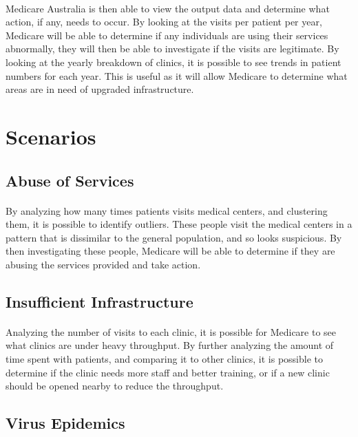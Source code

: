 \documentclass[a4paper,12pt,openany]{report}
\begin{document}
\paragraph{}
	Medicare Australia is then able to view the output data and determine what action, if any, needs to occur.
	By looking at the visits per patient per year, Medicare will be able to determine if any individuals are using their services abnormally, they will then be able to investigate if the visits are legitimate.
	By looking at the yearly breakdown of clinics, it is possible to see trends in patient numbers for each year.
	This is useful as it will allow Medicare to determine what areas are in need of upgraded infrastructure.

\section*{Scenarios}
\subsection*{Abuse of Services}
\paragraph{}
	By analyzing how many times patients visits medical centers, and clustering them, it is possible to identify outliers.
	These people visit the medical centers in a pattern that is dissimilar to the general population, and so looks suspicious.
	By then investigating these people, Medicare will be able to determine if they are abusing the services provided and take action.
\subsection*{Insufficient Infrastructure}
\paragraph{}
	Analyzing the number of visits to each clinic, it is possible for Medicare to see what clinics are under heavy throughput.
	By further analyzing the amount of time spent with patients, and comparing it to other clinics, it is possible to determine if the clinic needs more staff and better training, or if a new clinic should be opened nearby to reduce the throughput.
\subsection*{Virus Epidemics}
\end{document}
